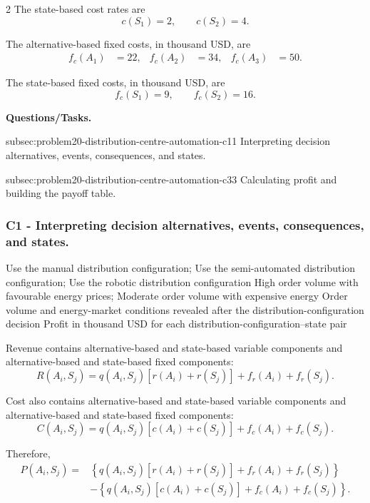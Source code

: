 \begin{multicols}{2}
	The state-based cost rates are
	\[
	c(S_1)=2,
	\qquad
	c(S_2)=4.
	\]
	
	The alternative-based fixed costs, in thousand USD, are
	\[
	\begin{aligned}
		f_c(A_1)&=22,
		&
		f_c(A_2)&=34,
		&
		f_c(A_3)&=50.
	\end{aligned}
	\]
	
	The state-based fixed costs, in thousand USD, are
	\[
	f_c(S_1)=9,
	\qquad
	f_c(S_2)=16.
	\]
\end{multicols}

\textbf{Questions/Tasks.}
\begin{enumerate}
	\CriterionTask
	{subsec:problem20-distribution-centre-automation-c1}{1}
	{Interpreting decision alternatives, events, consequences, and states.}

	\CriterionTask
	{subsec:problem20-distribution-centre-automation-c3}{3}
	{Calculating profit and building the payoff table.}
\end{enumerate}

\subsubsection*{C1 - Interpreting decision alternatives, events, consequences, and states.}
\label{subsec:problem20-distribution-centre-automation-c1}

\DecisionElementsTable
{Use the manual distribution configuration; Use the semi-automated distribution configuration; Use the robotic distribution configuration}
{High order volume with favourable energy prices; Moderate order volume with expensive energy}
{Order volume and energy-market conditions revealed after the distribution-configuration decision}
{Profit in thousand USD for each distribution-configuration--state pair}

Revenue contains alternative-based and state-based variable components and
alternative-based and state-based fixed components:
\[
R(A_i,S_j)
=
q(A_i,S_j)
\left[
r(A_i)+r(S_j)
\right]
+
f_r(A_i)
+
f_r(S_j).
\]

Cost also contains alternative-based and state-based variable components and
alternative-based and state-based fixed components:
\[
C(A_i,S_j)
=
q(A_i,S_j)
\left[
c(A_i)+c(S_j)
\right]
+
f_c(A_i)
+
f_c(S_j).
\]

Therefore,
\[
\begin{aligned}
	P(A_i,S_j)
	={}&
	\left\{
	q(A_i,S_j)
	\left[
	r(A_i)+r(S_j)
	\right]
	+
	f_r(A_i)
	+
	f_r(S_j)
	\right\}
	\\
	&-
	\left\{
	q(A_i,S_j)
	\left[
	c(A_i)+c(S_j)
	\right]
	+
	f_c(A_i)
	+
	f_c(S_j)
	\right\}.
\end{aligned}
\]

